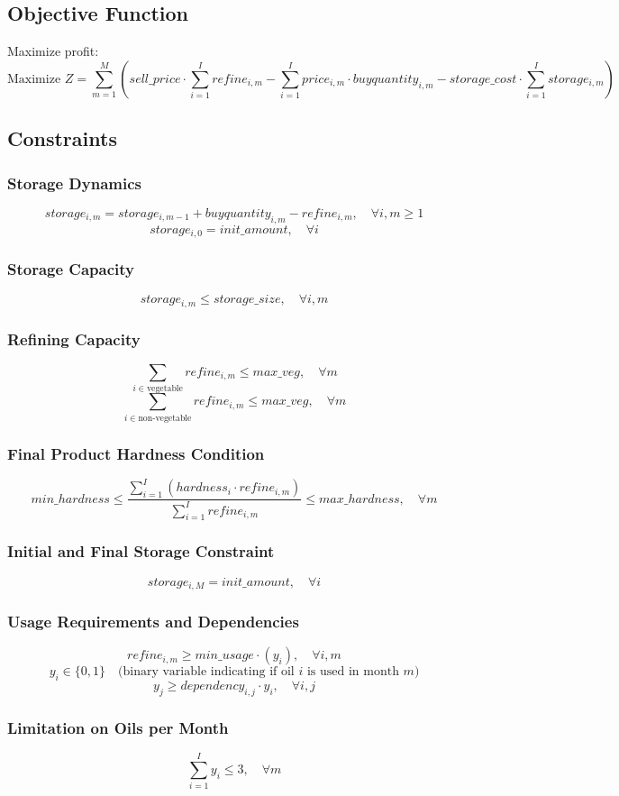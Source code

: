 \documentclass{article}
\begin{document}
\subsection*{Objective Function}
Maximize profit:
\[
\text{Maximize } Z = \sum_{m=1}^{M} \left( sell\_price \cdot \sum_{i=1}^{I} refine_{i,m} - \sum_{i=1}^{I} price_{i,m} \cdot buyquantity_{i,m} - storage\_cost \cdot \sum_{i=1}^{I} storage_{i,m} \right)
\]

\subsection*{Constraints}

\subsubsection*{Storage Dynamics}
\[
storage_{i,m} = storage_{i,m-1} + buyquantity_{i,m} - refine_{i,m}, \quad \forall i, m \geq 1
\]
\[
storage_{i,0} = init\_amount, \quad \forall i
\]

\subsubsection*{Storage Capacity}
\[
storage_{i,m} \leq storage\_size, \quad \forall i, m
\]

\subsubsection*{Refining Capacity}
\[
\sum_{i \in \text{vegetable}} refine_{i,m} \leq max\_veg, \quad \forall m
\]
\[
\sum_{i \in \text{non-vegetable}} refine_{i,m} \leq max\_veg, \quad \forall m
\]

\subsubsection*{Final Product Hardness Condition}
\[
min\_hardness \leq \frac{\sum_{i=1}^{I} (hardness_{i} \cdot refine_{i,m})}{\sum_{i=1}^{I} refine_{i,m}} \leq max\_hardness, \quad \forall m
\]

\subsubsection*{Initial and Final Storage Constraint}
\[
storage_{i,M} = init\_amount, \quad \forall i
\]

\subsubsection*{Usage Requirements and Dependencies}
\[
refine_{i,m} \geq min\_usage \cdot (y_i), \quad \forall i, m
\]
\[
y_i \in \{0, 1\} \quad \text{(binary variable indicating if oil $i$ is used in month $m$)}
\]
\[
y_j \geq dependency_{i,j} \cdot y_i, \quad \forall i,j
\]

\subsubsection*{Limitation on Oils per Month}
\[
\sum_{i=1}^{I} y_i \leq 3, \quad \forall m
\]
\end{document}
